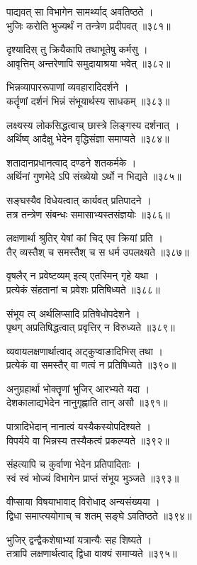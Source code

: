 पाद्यवत् सा विभागेन सामर्थ्याद् अवतिष्ठते ।\\भुजिः करोति भुज्यर्थं न तन्त्रेण प्रदीपवत् ॥३८१॥

दृश्यादिस् तु क्रियैकापि तथाभूतेषु कर्मसु ।\\आवृत्तिम् अन्तरेणापि समुदायाश्रया भवेत् ॥३८२॥

भिन्नव्यापाररूपाणां व्यवहारादिदर्शने ।\\कर्तॄणां दर्शनं भिन्नं संभूयार्थस्य साधकम् ॥३८३॥

लक्ष्यस्य लोकसिद्धत्वाच् छास्त्रे लिङ्गस्य दर्शनात् ।\\अर्थिष्व् आदैक्षु भेदेन वृद्धिसंज्ञा समाप्यते ॥३८४॥

शतादानप्रधानत्वाद् दण्डने शतकर्मके ।\\अर्थिनां गुणभेदे ऽपि संख्येयो ऽर्थो न भिद्यते ॥३८५॥

सङ्घस्यैव विधेयत्वात् कार्यवत् प्रतिपादने ।\\तत्र तन्त्रेण संबन्धः समासाभ्यस्तसंज्ञयोः ॥३८६॥

लक्षणार्था श्रुतिर् येषां कां चिद् एव क्रियां प्रति ।\\तैर् व्यस्तैश् च समस्तैश् च स धर्म उपलक्ष्यते ॥३८७॥

वृषलैर् न प्रवेष्टव्यम् इत्य् एतस्मिन् गृहे यथा ।\\प्रत्येकं संहतानां च प्रवेशः प्रतिषिध्यते ॥३८८॥

संभूय त्व् अर्थलिप्सादि प्रतिषेधोपदेशने ।\\पृथग् अप्रतिषिद्धत्वात् प्रवृत्तिर् न विरुध्यते ॥३८९॥

व्यवायलक्षणार्थात्वाद् अट्कुप्वाङादिभिस् तथा ।\\प्रत्येकं वा समस्तैर् वा णत्वं न प्रतिषिध्यते ॥३९०॥

अनुग्रहार्था भोक्तॄणां भुजिर् आरभ्यते यदा ।\\देशकालाद्यभेदेन नानुगृह्णाति तान् असौ ॥३९१॥

पात्रादिभेदान् नानात्वं यस्यैकस्योपदिश्यते ।\\विपर्यये वा भिन्नस्य तस्यैकत्वं प्रकल्प्यते ॥३९२॥

संहत्यापि च कुर्वाणा भेदेन प्रतिपादिताः ।\\स्वं स्वं भोज्यं विभागेन प्राप्तं संभूय भुञ्जते ॥३९३॥

वीप्साया विषयाभावाद् विरोधाद् अन्यसंख्यया ।\\द्विधा समाप्त्ययोगाच् च शतम् सङ्घे ऽवतिष्ठते ॥३९४॥

भुजिर् द्वन्द्वैकशेषाभ्यां यत्रान्यैः सह शिष्यते ।\\तत्रापि लक्षणार्थत्वाद् द्विधा वाक्यं समाप्यते ॥३९५॥

